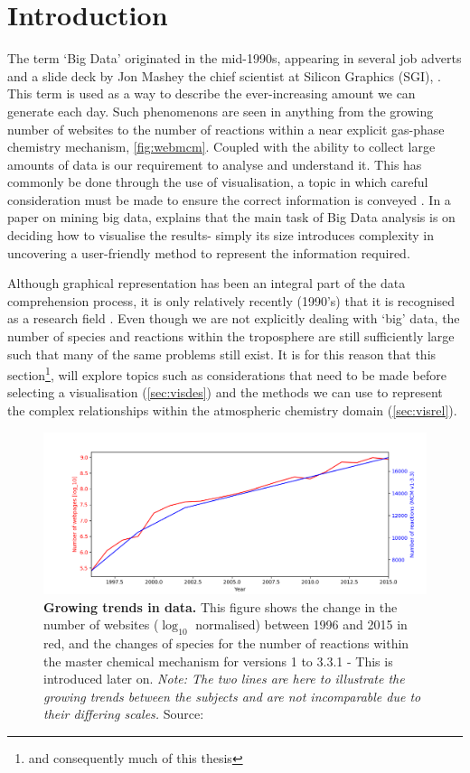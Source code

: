 

\section{Introduction}
The term `Big Data' originated in the mid-1990s, appearing in several job adverts and a slide deck by Jon Mashey the chief scientist at Silicon Graphics (SGI), \citep{slidedeck,bigdataorigin}. This term is used as a way to describe the ever-increasing amount we can generate each day. Such phenomenons are seen in anything from the growing number of websites to the number of reactions within a near explicit gas-phase chemistry mechanism, \autoref{fig:webmcm}. Coupled with the ability to collect large amounts of data is our requirement to analyse and understand it. This has commonly be done through the use of visualisation, a topic in which careful consideration must be made to ensure the correct information is conveyed \citep{kirk}. In a paper on mining big data, \citep{bigdatamine} explains that the main task of Big
Data analysis is on deciding how to visualise the results- simply its size introduces complexity in uncovering a user-friendly method to represent the information required. 

Although graphical representation has been an integral part of the data comprehension process, it is only relatively recently (1990's) that it is recognised as a research field \citep{ch6}. Even though we are not explicitly dealing with `big' data, the number of species and reactions within the troposphere are still sufficiently large such that many of the same problems still exist. It is for this reason that this section\footnote{and consequently much of this thesis}, will explore topics such as considerations that need to be made before selecting a visualisation (\autoref{sec:visdes}) and the methods we can use to represent the complex relationships within the atmospheric chemistry domain (\autoref{sec:visrel}). 

\begin{figure}[H]
     \centering
         \includegraphics[width=.95\textwidth]{figures_c1/webmcm.png}
         \caption{\textbf{Growing trends in data.} This figure shows the change in the number of websites ($\log_{10}$ normalised) between 1996 and 2015 in red, and the changes of species for the number of reactions within the master chemical mechanism for versions 1 to 3.3.1 - This is introduced later on. \emph{Note: The two lines are here to illustrate the growing trends between the subjects and are not incomparable due to their differing scales.}  Source: \citep{webstats,mcmhist}}
         \label{fig:webmcm}
\end{figure}


